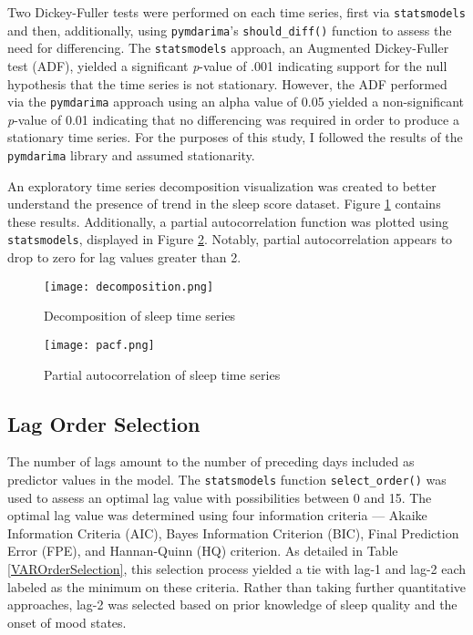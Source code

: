 \documentclass[9pt]{article}
\begin{document}
Two Dickey-Fuller tests were performed on each time series, first via
\texttt{statsmodels} and then, additionally, using \texttt{pymdarima}'s
\texttt{should\_diff()} function to assess the need for differencing. The
\texttt{statsmodels} approach, an Augmented Dickey-Fuller test (ADF), yielded a
significant \textit{p}-value of .001 indicating support for the null hypothesis
that the time series is not stationary. However, the ADF performed via the
\texttt{pymdarima} approach using an alpha value of 0.05 yielded a
non-significant \textit{p}-value of 0.01 indicating that no differencing was
required in order to produce a stationary time series. For the purposes of this
study, I followed the results of the \texttt{pymdarima} library and assumed
stationarity.

An exploratory time series decomposition visualization was created to better
understand the presence of trend in the sleep score dataset. Figure
\ref{Decomposition} contains these results. Additionally, a partial
autocorrelation function was plotted using \texttt{statsmodels}, displayed in
Figure \ref{PACF}. Notably, partial autocorrelation appears to drop to zero for
lag values greater than 2.


\begin{figure}[h!] \centering
  \texttt{[image: decomposition.png]}
  \caption{Decomposition of sleep time series} \label{Decomposition}
\end{figure}

\begin{figure}[h!] \centering
\texttt{[image: pacf.png]} \caption{Partial
autocorrelation of sleep time series} \label{PACF} \end{figure}

\subsection{Lag Order Selection}\label{lag-order-selection}

The number of lags amount to the number of preceding days included as predictor
values in the model. The \texttt{statsmodels} function \texttt{select\_order()}
was used to assess an optimal lag value with possibilities between 0 and 15.
The optimal lag value was determined using four information criteria --- Akaike
Information Criteria (AIC), Bayes Information Criterion (BIC), Final Prediction
Error (FPE), and Hannan-Quinn (HQ) criterion. As detailed in Table
\ref{VAROrderSelection}, this selection process yielded a tie with lag-1 and
lag-2 each labeled as the minimum on these criteria. Rather than taking further
quantitative approaches, lag-2 was selected based on prior knowledge of sleep
quality and the onset of mood states.
\end{document}
